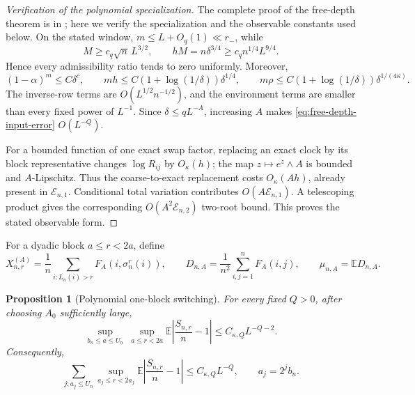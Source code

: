 \documentclass[11pt]{article}
\newtheorem{proposition}[theorem]{Proposition}
\theoremstyle{remark}
\newcommand{\Ee}{\mathbb E}
\begin{document}
\begin{proof}[Verification of the polynomial specialization]
The complete proof of the free-depth theorem is in
\cite{LongSwitch2026}; here we verify the specialization and the observable
constants used below.  On the stated window,
$m\le L+O_q(1)\ll r_-$, while
\[
 M\ge c_q\sqrt n\,L^{3/2},
 \qquad
 hM=n\delta^{3/4}\ge c_qn^{1/4}L^{9/4}.
\]
Hence every admissibility ratio tends to zero uniformly.  Moreover,
\[
 (1-\alpha)^m\le C\delta^c,
 \qquad
 mh\le C(1+\log(1/\delta))\delta^{1/4},
 \qquad
 m\rho\le C(1+\log(1/\delta))\delta^{1/(4\kappa)}.
\]
The inverse-row terms are $O(L^{1/2}n^{-1/2})$, and the environment terms
are smaller than every fixed power of $L^{-1}$.  Since
$\delta\le qL^{-A}$, increasing $A$ makes
\eqref{eq:free-depth-input-error} $O(L^{-Q})$.

For a bounded function of one exact swap factor, replacing an exact clock by
its block representative changes $\log R_{ij}$ by $O_\kappa(h)$; the map
$z\mapsto e^z\wedge A$ is bounded and $A$-Lipschitz.  Thus the
coarse-to-exact replacement costs $O_\kappa(Ah)$, already present in
$\mathcal E_{n,1}$.  Conditional total variation contributes
$O(A\mathcal E_{n,1})$.  A telescoping product gives the corresponding
$O(A^2\mathcal E_{n,2})$ two-root bound.  This proves the stated observable
form.
\end{proof}

For a dyadic block $a\le r<2a$, define
\[
 X_{n,r}^{(A)}=\frac1n\sum_{i:L_n(i)>r}F_A(i,\sigma_n^r(i)),
 \qquad
 D_{n,A}=\frac1{n^2}\sum_{i,j=1}^nF_A(i,j),
 \qquad
 \mu_{n,A}=\Ee D_{n,A}.
\]

\begin{proposition}[Polynomial one-block switching]
\label{prop:poly-block}
For every fixed $Q>0$, after choosing $A_0$ sufficiently large,
\[
 \sup_{b_n\le a\le U_n}\ \sup_{a\le r<2a}
 \Ee\left|\frac{S_{n,r}}n-1\right|
 \le C_{\kappa,Q}L^{-Q-2}.
\]
Consequently,
\begin{equation}
\label{eq:poly-unweighted-dyadic}
 \sum_{j:a_j\le U_n}
 \sup_{a_j\le r<2a_j}
 \Ee\left|\frac{S_{n,r}}n-1\right|
 \le C_{\kappa,Q}L^{-Q},
 \qquad a_j=2^jb_n.
\end{equation}
\end{proposition}
\end{document}
